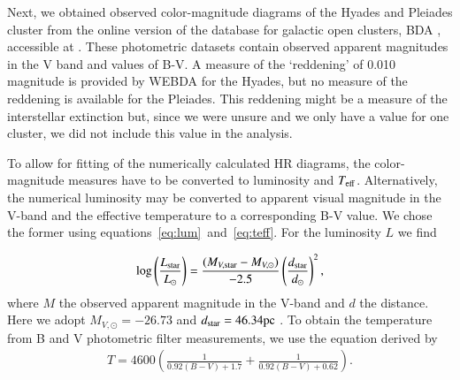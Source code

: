 \documentclass{aa}
\newcommand{\Sun}[0]{\ensuremath{_{\odot}}}
\begin{document}
    Next, we obtained observed color-magnitude diagrams of the Hyades and Pleiades cluster from the online version of the database for galactic open clusters, BDA \citep{1995ASSL..203..127M}, accessible at \citep{webda}. These photometric datasets contain observed apparent magnitudes in the V band and values of B-V. A measure of the `reddening' of 0.010 magnitude is provided by WEBDA for the Hyades, but no measure of the reddening is available for the Pleiades. This reddening might be a measure of the interstellar extinction but, since we were unsure and we only have a value for one cluster, we did not include this value in the analysis. 

    To allow for fitting of the numerically calculated HR diagrams, the color-magnitude measures have to be converted to luminosity and $T_{\rm eff}$. Alternatively, the numerical luminosity may be converted to apparent visual magnitude in the V-band and the effective temperature to a corresponding B-V value. We chose the former using equations~\eqref{eq:lum}~and~\eqref{eq:teff}. For the luminosity $L$ we find


\begin{eqnarray}
    \log \left(\frac{L_{\rm star}}{L\Sun}\right) = \frac{(M_{V,\rm star}-M_{V,\odot})}{-2.5} \left(\frac{d_{\rm star}}{d\Sun}\right)^2 \label{eq:lum},
\end{eqnarray}
where $M$ the observed apparent magnitude in the V-band and $d$ the distance. Here we adopt $M_{V, \odot} = -26.73$ \citep{1957ApJ...126..266S} and $d_{\rm star} = 46.34 \text{pc}$ \citep{1998A&A...331...81P}. To obtain the temperature from B and V photometric filter measurements, we use the equation derived by \citet{2012EL.....9734008B}
\begin{eqnarray}
    T = 4600 \left(\frac{1}{0.92 (B-V) + 1.7} + \frac{1}{0.92(B-V) + 0.62} \right) \label{eq:teff}.
\end{eqnarray}
\end{document}
